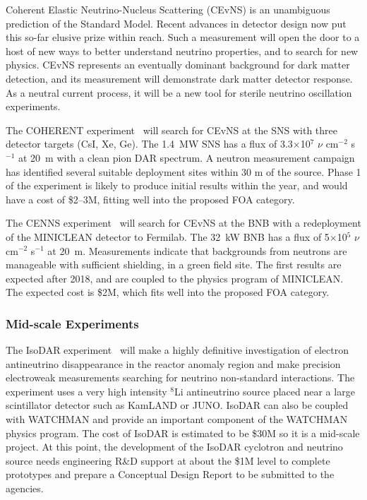 
\noindent Coherent Elastic Neutrino-Nucleus Scattering (CEvNS) is an
unambiguous prediction of the Standard Model. Recent advances in
detector design now put this so-far elusive prize within reach. Such a
measurement will open the door to a host of new ways to better
understand neutrino properties, and to search for new physics. CEvNS
represents an eventually dominant background for dark matter
detection, and its measurement will demonstrate dark matter detector
response. As a neutral current process, it will be a new tool for
sterile neutrino oscillation experiments.

The COHERENT experiment~\cite{Akimov:2013yow} will search for CEvNS at the
SNS with three detector targets (CsI, Xe, Ge). The 1.4~MW SNS has a
flux of 3.3$\times$10$^{7}$ $\nu$ cm$^{-2}$ s$^{-1}$ at 20~m with a
clean pion DAR spectrum. A neutron measurement campaign has identified
several suitable deployment sites within 30 m of the source. Phase 1
of the experiment is likely to produce initial results within the
year, and would have a cost of \$2--3M, fitting well into the proposed
FOA category.

The CENNS experiment~\cite{Brice:2013fwa} will search for CEvNS at the
BNB with a redeployment of the MINICLEAN detector to Fermilab. The
32~kW BNB has a flux of 5$\times$10$^{5}$ $\nu$ cm$^{-2}$ s$^{-1}$ at
20~m. Measurements indicate that backgrounds from neutrons are
manageable with sufficient shielding, in a green field site. The first
results are expected after 2018, and are coupled to the physics
program of MINICLEAN. The expected cost is \$2M, which fits well into
the proposed FOA category.

\subsubsection{Mid-scale Experiments}


\noindent The IsoDAR experiment~\cite{IsoDAR,IsoDARJuno} will make a
highly definitive investigation of electron antineutrino disappearance
in the reactor anomaly region and make precision electroweak
measurements searching for neutrino non-standard interactions. The
experiment uses a very high intensity $^8$Li antineutrino source placed
near a large scintillator detector such as KamLAND or JUNO. IsoDAR
can also be coupled with WATCHMAN and provide an important component
of the WATCHMAN physics program. The cost of IsoDAR is estimated to
be \$30M so it is a mid-scale project. At this point, the development
of the IsoDAR cyclotron and neutrino source needs engineering R\&D
support at about the \$1M level to complete prototypes and prepare a
Conceptual Design Report to be submitted to the agencies.

